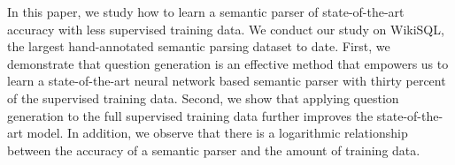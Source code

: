 In this paper, we study how to learn a semantic parser of state-of-the-art accuracy with less supervised training data. We conduct our study on WikiSQL, the largest hand-annotated semantic parsing dataset to date. First, we demonstrate that question generation is an effective method that empowers us to learn a state-of-the-art neural network based semantic parser with thirty percent of the supervised training data. Second, we show that applying question generation to the full supervised training data further improves the state-of-the-art model. In addition, we observe that there is a logarithmic relationship between the accuracy of a semantic parser and the amount of training data.
